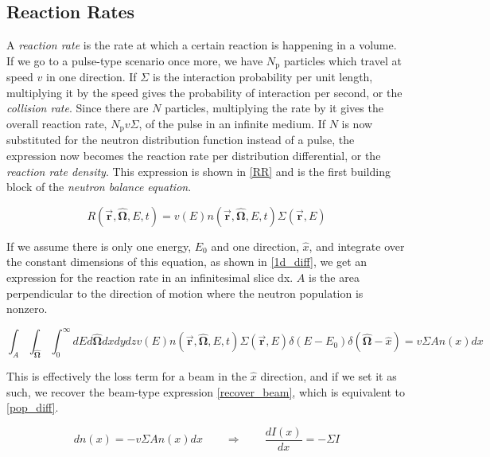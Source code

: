 \subsection{Reaction Rates}

A \emph{reaction rate} is the rate at which a certain reaction is happening in a volume.  If we go to a pulse-type scenario once more, we have $N_\mathrm{p}$ particles which travel at speed $v$ in one direction.  If $\Sigma$ is the interaction probability per unit length, multiplying it by the speed gives the probability of interaction per second, or the \emph{collision rate}.  Since there are $N$ particles, multiplying the rate by it gives the overall reaction rate, $N_\mathrm{p} v \Sigma$, of the pulse in an infinite medium.  If $N$ is now substituted for the neutron distribution function instead of a pulse, the expression now becomes the reaction rate per distribution differential, or the \emph{reaction rate density}.  This expression is shown in \eqref{RR} and is the first building block of the \emph{neutron balance equation}.

\begin{equation}
\label{RR}
R(\boldsymbol{\vec{r}},\boldsymbol{\hat{\Omega}},E,t)  = v(E) n(\boldsymbol{\vec{r}},\boldsymbol{\hat{\Omega}},E,t) \Sigma(\boldsymbol{\vec{r}},E)
\end{equation}

If we assume there is only one energy, $E_0$ and one direction, $\hat{x}$, and integrate over the constant dimensions of this equation, as shown in \eqref{1d_diff}, we get an expression for the reaction rate in an infinitesimal slice dx.  $A$ is the area perpendicular to the direction of motion where the neutron population is nonzero.


\begin{equation}
\label{1d_diff}
\int_A \int_{\boldsymbol{\hat{\Omega}}} \int_0^{\infty}  dE d\boldsymbol{\hat{\Omega}} dxdydz  v(E) n(\boldsymbol{\vec{r}},\boldsymbol{\hat{\Omega}},E,t) \Sigma(\boldsymbol{\vec{r}},E) \delta(E-E_0) \delta(\boldsymbol{\hat{\Omega}}-\hat{x})  = v \Sigma A n(x)dx 
\end{equation}

This is effectively the loss term for a beam in the $\hat{x}$ direction, and if we set it as such, we recover the beam-type expression \eqref{recover_beam}, which is equivalent to \eqref{pop_diff}.  

\begin{equation}
\label{recover_beam}
dn(x) = - v \Sigma A n(x)dx  \qquad \Rightarrow \qquad  \frac{dI(x)}{dx}= - \Sigma I
\end{equation}


